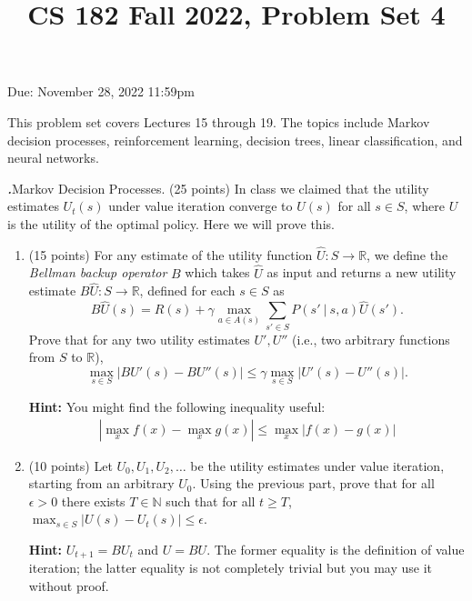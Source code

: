 \documentclass[12pt]{amsart}
\title{CS 182 Fall 2022, Problem Set 4}
\newenvironment{statement}[1]{\smallskip\noindent\color[rgb]{0.0,0.0,0.0} {\bf #1.}}{}
\newcommand{\1}{\mathds{1}}
\begin{document}
\maketitle

\vspace*{-0.25in}
\centerline{Due: November 28, 2022 11:59pm}


\begin{center}
\end{center}
\vspace*{0.15in}


\noindent This problem set covers Lectures 15 through 19. The topics include Markov decision processes, reinforcement learning, decision trees, linear classification, and neural networks.
\vspace*{0.35in}


\begin{statement}{1} \emph{Markov Decision Processes.} (25 points) 
In class we claimed that the utility estimates $U_t(s)$ under value iteration converge to $U(s)$ for all $s\in S$, where $U$ is the utility of the optimal policy. Here we will prove this. 

\begin{enumerate}
\item (15 points) For any estimate of the utility function $\hat{U}:S\rightarrow \mathbb{R}$, we define the \emph{Bellman backup operator} $B$ which takes $\hat{U}$ as input and returns a new utility estimate $B\hat{U}:S\rightarrow \mathbb{R}$, defined for each $s\in S$ as
$$
B\hat{U}(s)=R(s) + \gamma \max_{a\in A(s)}\sum_{s'\in S}P(s'\ |\ s,a)\hat{U}(s').
$$
Prove that for any two utility estimates $U',U''$ (i.e., two arbitrary functions from $S$ to $\mathbb{R}$),
$$
\max_{s\in S}|BU'(s)-BU''(s)|\leq \gamma \max_{s\in S}|U'(s)-U''(s)|.
$$

\noindent \textbf{Hint:} You might find the following inequality useful:
\begin{align*}
|\max_x f(x) - \max_x g(x)| \le \max_x |f(x) - g(x)|
\end{align*}

\item (10 points) Let $U_0,U_1,U_2,\ldots$ be the utility estimates under value iteration, starting from an arbitrary $U_0$.  Using the previous part, prove that for all $\epsilon >0$ there exists $T\in \mathbb{N}$ such that for all $t\geq T$, $\max_{s\in S}|U(s)-U_t(s)|\leq \epsilon$.

\noindent \textbf{Hint:} $U_{t+1}=BU_t$ and $U=BU$. The former equality is the definition of value iteration; the latter equality is not completely trivial but you may use it without proof. 
\end{enumerate}
\end{statement}
\end{document}
